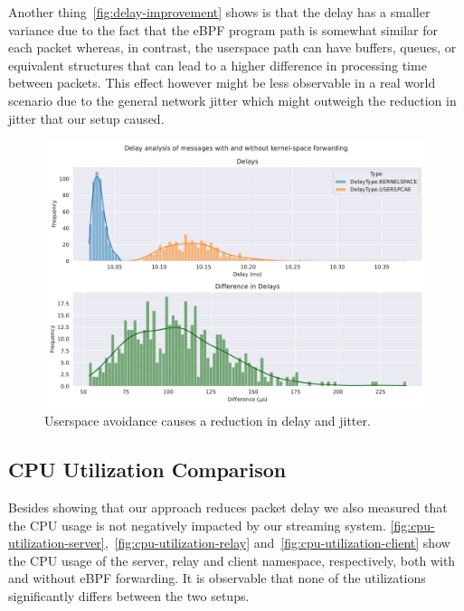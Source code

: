 Another thing~\autoref{fig:delay-improvement} shows is that the delay has a smaller variance due to the fact 
that the eBPF program path is somewhat similar for each packet whereas, in contrast, the userspace path can have 
buffers, queues, or equivalent structures that can lead to a higher difference in processing time between packets. 
This effect however might be less observable in a real world scenario due to the general network jitter which 
might outweigh the reduction in jitter that our setup caused.
\begin{figure}[htbp]
    \centering
    \includegraphics[width=\textwidth]{figures/04_testing_and_results/delays_small_packets_simple_userspace.pdf}
    \caption[Delay analysis of eBPF approach]{Userspace avoidance causes a reduction in delay and jitter.}\label{fig:delay-improvement}
\end{figure}

\subsection{CPU Utilization Comparison}
Besides showing that our approach reduces packet delay we also measured that the CPU usage is 
not negatively impacted by our streaming system.
\autoref{fig:cpu-utilization-server},~\ref{fig:cpu-utilization-relay} and~\ref{fig:cpu-utilization-client}
show the CPU usage of the server, relay and client namespace, respectively, both with and without eBPF forwarding.
It is observable that none of the utilizations significantly differs between the two setups. 

